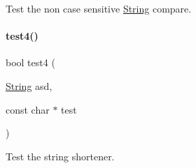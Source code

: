 Test the non case sensitive \mbox{\hyperlink{class_string}{String}} compare. 

\mbox{\label{atest_8cpp_ab545ece7a108a6470a3dc2161ba0008b}} 
\paragraph{\texorpdfstring{test4()}{test4()}}
{\footnotesize\ttfamily bool test4 (\begin{DoxyParamCaption}\item[{\mbox{\hyperlink{class_string}{String}}}]{asd,  }\item[{const char $\ast$}]{test }\end{DoxyParamCaption})}



Test the string shortener. 

